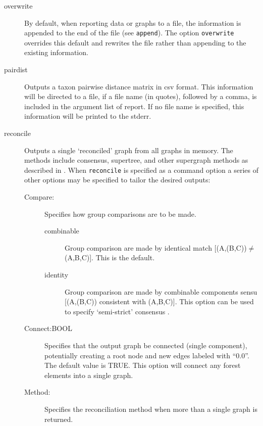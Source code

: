 \begin{description}
		\item[overwrite] By default, when reporting data or graphs to a file, the 
		information is appended to the end of the file (see \texttt{append}). The 
		option \texttt{overwrite} overrides this default and rewrites the file rather 
		than appending to the existing information.

		\item[pairdist] Outputs a taxon pairwise distance matrix in csv format. 
		This information will be directed to a file, if a file name (in quotes), followed 
		by a comma, is included in the argument list of report. If no file name is 
		specified, this information will be printed to the stderr.
		
		\item[reconcile] Outputs a single `reconciled' graph from all graphs in 
		memory. The methods include consensus, supertree, and other supergraph 
		methods as described in \cite{Wheeler2012, Wheeler2022}. When \texttt{reconcile} 
		is specified as a command option a series of other options may be specified 
		to tailor the desired outputs:
		
		\begin{description}
		
			\item [Compare:] Specifies how group comparisons are to be made.
						
			\begin{description}
				\item[combinable] Group comparison are made by identical match 
				[(A,(B,C))$\neq$(A,B,C)]. This is the default.	
								
				\item[identity] Group comparison are made by combinable components sensu 
				     \cite{Nelson1979} [(A,(B,C)) consistent with (A,B,C)]. This option can be used 
				     to specify `semi-strict' consensus \citep{Bremer1990}.
				     
			\end{description}
			
			\item [Connect:BOOL] Specifies that the output graph be connected 
			(single component), potentially creating a root node and new edges labeled 
			with ``0.0''. The default value is TRUE. This option will connect any forest elements
			into a single graph. 
			
			\item [Method:] Specifies the reconciliation method when more than a single
			   graph is returned.
			

\end{description}
\end{description}
